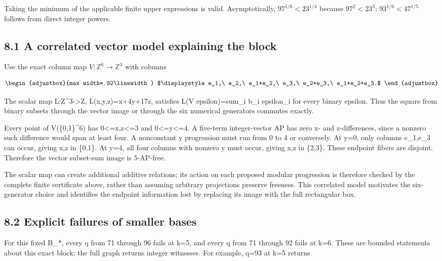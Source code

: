Taking the minimum of the applicable finite upper expressions is valid. Asymptotically, \(97^{1/6}<23^{1/4}\) because \(97^2<23^3\); \(93^{1/6}<47^{1/5}\) follows from direct integer powers.

\subsection{8.1 A correlated vector model explaining the block}\label{n02-a-correlated-vector-model-explaining-the-block}

Use the exact column map \(V:\mathbb Z^6\to\mathbb Z^3\) with columns

\[
\begin{adjustbox}{max width=.92\linewidth}
$\displaystyle e_1,\ e_2,\ e_1+e_2,\ e_3,\ e_2+e_3,\ e_1+e_2+e_3.$
\end{adjustbox}
\]

The scalar map L:Z\^{}3-\textgreater Z, L(x,y,z)=x+4y+17z, satisfies L(V epsilon)=sum\_i b\_i epsilon\_i for every binary epsilon. Thus the square from binary subsets through the vector image or through the six numerical generators commutes exactly.

Every point of V(\{0,1\}\^{}6) has 0\textless=x,z\textless=3 and 0\textless=y\textless=4. A five-term integer-vector AP has zero x- and z-differences, since a nonzero such difference would span at least four. A nonconstant y progression must run from 0 to 4 or conversely. At y=0, only columns e\_1,e\_3 can occur, giving x,z in \{0,1\}. At y=4, all four columns with nonzero y must occur, giving x,z in \{2,3\}. These endpoint fibers are disjoint. Therefore the vector subset-sum image is 5-AP-free.

The scalar map can create additional additive relations; its action on each proposed modular progression is therefore checked by the complete finite certificate above, rather than assuming arbitrary projections preserve freeness. This correlated model motivates the six-generator choice and identifies the endpoint information lost by replacing its image with the full rectangular box.

\subsection{8.2 Explicit failures of smaller bases}\label{n02-explicit-failures-of-smaller-bases}

For this fixed B\_*, every q from 71 through 96 fails at k=5, and every q from 71 through 92 fails at k=6. These are bounded statements about this exact block; the full graph returns integer witnesses. For example, q=93 at k=5 returns

